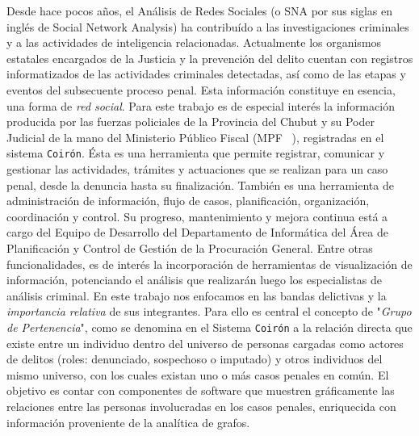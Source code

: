 \vspace{-5pt}
Desde hace pocos años, el Análisis de Redes Sociales (o SNA por sus siglas en inglés de Social Network Analysis) ha contribuído a las investigaciones criminales y a las actividades de inteligencia relacionadas.
Actualmente los organismos estatales encargados de la Justicia y la prevención del delito cuentan con registros informatizados de las actividades criminales detectadas, así como de las etapas y eventos del subsecuente proceso penal. 
Esta información constituye en esencia, una forma de \textit{red social}. 
Para este trabajo es de especial interés la información producida por las fuerzas policiales de la Provincia del Chubut y su Poder Judicial de la mano del Ministerio Público Fiscal (MPF ~\cite{MPFChubutPaginaWeb}), registradas en el sistema \texttt{Coirón}. 
Ésta es una herramienta que permite registrar, comunicar y gestionar las actividades, trámites y actuaciones que se realizan para un caso penal, desde la denuncia hasta su finalización. También es una herramienta de administración de información, flujo de casos, planificación, organización, coordinación y control.
Su progreso, mantenimiento y mejora continua está a cargo del Equipo de Desarrollo del Departamento de Informática del Área de Planificación y Control de Gestión de la Procuración General.
Entre otras funcionalidades, es de interés la incorporación de herramientas de visualización de información, potenciando el análisis que realizarán luego los especialistas de análisis criminal.
En este trabajo nos enfocamos en las bandas delictivas y la \textit{importancia relativa} de sus integrantes. 
Para ello es central el concepto de "\textit{Grupo de Pertenencia}", como se denomina en el Sistema \texttt{Coirón} a la relación directa que existe entre un individuo dentro del universo de personas cargadas como actores de delitos (roles: denunciado, sospechoso o imputado) y otros individuos del mismo universo, con los cuales existan uno o más casos penales en común.
El objetivo es contar con componentes de software que 
muestren gráficamente las relaciones entre las personas involucradas en los casos penales, enriquecida con información proveniente de la analítica de grafos. 

